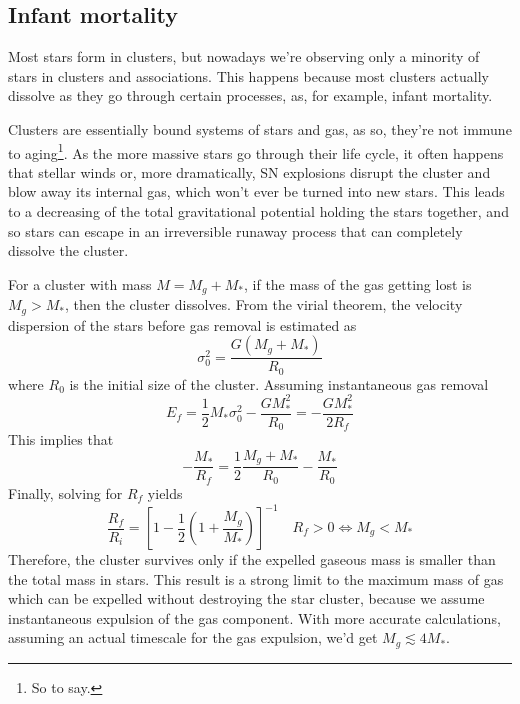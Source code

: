 \subsection{Infant mortality}
Most stars form in clusters, but nowadays we're observing only a minority of stars in clusters and associations. This happens because most clusters actually dissolve as they go through certain processes, as, for example, infant mortality.
\par Clusters are essentially bound systems of stars and gas, as so, they're not immune to aging\footnote{So to say.}. As the more massive stars go through their life cycle, it often happens that stellar winds or, more dramatically, SN explosions disrupt the cluster and blow away its internal gas, which won't ever be turned into new stars. This leads to a decreasing of the total gravitational potential holding the stars together, and so stars can escape in an irreversible runaway process that can completely dissolve the cluster.
\par For a cluster with mass $M = M_{g}+M_{*}$, if the mass of the gas getting lost is $M_{g}>M_{*}$, then the cluster dissolves. From the virial theorem, the velocity dispersion of the stars before gas removal is estimated as 
\begin{equation*}
    \sigma_{0}^{2} = \frac{G(M_{g}+M_{*})}{R_{0}}
\end{equation*}
where $R_{0}$ is the initial size of the cluster. Assuming instantaneous gas removal
\begin{equation*}
    E_{f} = \frac{1}{2}M_{*}\sigma_{0}^{2}-\frac{GM^{2}_{*}}{R_{0}} = -\frac{GM^{2}_{*}}{2R_{f}}
\end{equation*}
This implies that 
\begin{equation*}
    -\frac{M_{*}}{R_{f}} = \frac{1}{2}\frac{M_{g}+M_{*}}{R_{0}}-\frac{M_{*}}{R_{0}}
\end{equation*}
Finally, solving for $R_{f}$ yields
\begin{equation}
    \frac{R_{f}}{R_{i}} = \left[1-\frac{1}{2}\left(1+\frac{M_{g}}{M_{*}} \right) \right]^{-1} \quad R_{f}>0 \iff M_{g}<M_{*}
    \label{eq:infantmortality}
\end{equation}
Therefore, the cluster survives only if the expelled gaseous mass is smaller than the total mass in stars. This result is a strong limit to the maximum mass of gas which can be expelled without destroying the star cluster, because we assume instantaneous expulsion of the gas component. With more accurate calculations, assuming an actual timescale for the gas expulsion, we'd get $M_{g}\lesssim 4M_{*}$.

